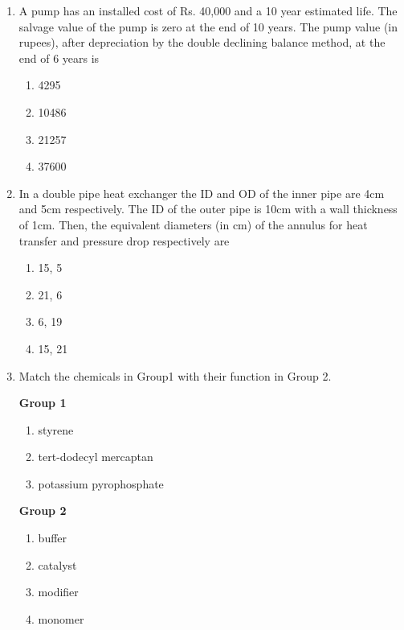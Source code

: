 \documentclass[journal,12pt,onecolumn]{IEEEtran}
\theoremstyle{remark}
\begin{document}
\begin{enumerate}
    \item A pump has an installed cost of Rs. 40,000 and a 10 year estimated life. The salvage value of the pump is zero at the end of 10 years. The pump value (in rupees), after depreciation by the double declining balance method, at the end of 6 years is

\begin{multicols}{4}
\begin{enumerate}
    \item 4295
    \item 10486
    \item 21257
    \item 37600
\end{enumerate}
\end{multicols}

\item In a double pipe heat exchanger the ID and OD of the inner pipe are 4cm and 5cm respectively. The ID of the outer pipe is 10cm with a wall thickness of 1cm. Then, the equivalent diameters (in cm) of the annulus for heat transfer and pressure drop respectively are

    \begin{multicols}{4}
    \begin{enumerate}
        \item 15, 5
        \item 21, 6
        \item 6, 19
        \item 15, 21
    \end{enumerate}
    \end{multicols}


    \item Match the chemicals in Group1 with their function in Group 2.

\begin{multicols}{2}
\textbf{Group 1}
\begin{enumerate}[label =\Alph*]
    \item styrene
    \item tert-dodecyl mercaptan
    \item potassium pyrophosphate
\end{enumerate}

\columnbreak

\textbf{Group 2}
\begin{enumerate}[label =\Roman*]
    \item buffer
    \item catalyst
    \item modifier
    \item monomer
\end{enumerate}
\end{multicols}


\end{enumerate}
\end{document}
